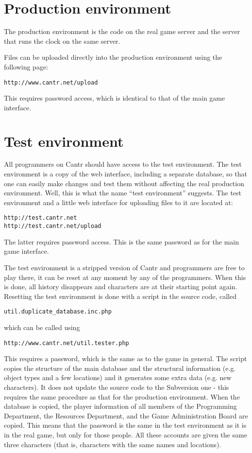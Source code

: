 \documentclass[a4paper,12pt]{article}
\begin{document}
\section{Production environment}

The production environment is the code on the real game server and the server that runs the clock on the same server. 

Files can be uploaded directly into the production environment using the following page:
\begin{verbatim}
http://www.cantr.net/upload
\end{verbatim}
This requires password access, which is identical to that of the main game interface.

\section{Test environment}

All programmers on Cantr should have access to the test environment. The test environment is a copy of the web interface, including a separate database, so that one can easily make changes and test them without affecting the real production environment. Well, this is what the name ``test environment'' suggests. The test environment and a little web interface for uploading files to it are located at:
\begin{verbatim}
http://test.cantr.net
http://test.cantr.net/upload
\end{verbatim}
The latter requires password access. This is the same password as for the main game interface.

The test environment is a stripped version of Cantr and programmers are free to play there, it can be reset at any moment by any of the programmers. When this is done, all history disappears and characters are at their starting point again. Resetting the test environment is done with a script in the source code, called
\begin{verbatim}
util.duplicate_database.inc.php
\end{verbatim}
which can be called using
\begin{verbatim}
http://www.cantr.net/util.tester.php
\end{verbatim}
This requires a password, which is the same as to the game in general. The script copies the structure of the main database and the structural information (e.g. object types and a few locations) and it generates some extra data (e.g. new characters). It does not update the source code to the Subversion one - this requires the same procedure as that for the production environment. When the database is copied, the player information of all members of the Programming Department, the Resources Department, and the Game Administration Board are copied. This means that the password is the same in the test environment as it is in the real game, but only for those people. All these accounts are given the same three characters (that is, characters with the same names and locations).
\end{document}
